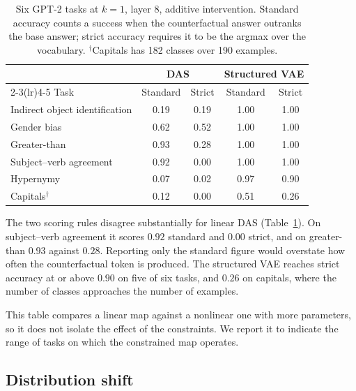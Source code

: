 \documentclass[11pt]{article}
\begin{document}
\begin{table}[t]
\centering
\small
\begin{tabular}{lcccc}
\toprule
& \multicolumn{2}{c}{DAS} & \multicolumn{2}{c}{Structured VAE} \\
\cmidrule(lr){2-3}\cmidrule(lr){4-5}
Task & Standard & Strict & Standard & Strict \\
\midrule
Indirect object identification & 0.19 & 0.19 & 1.00 & 1.00 \\
Gender bias                    & 0.62 & 0.52 & 1.00 & 1.00 \\
Greater-than                   & 0.93 & 0.28 & 1.00 & 1.00 \\
Subject--verb agreement        & 0.92 & 0.00 & 1.00 & 1.00 \\
Hypernymy                      & 0.07 & 0.02 & 0.97 & 0.90 \\
Capitals$^\dagger$             & 0.12 & 0.00 & 0.51 & 0.26 \\
\bottomrule
\end{tabular}
\caption{Six GPT-2 tasks at $k = 1$, layer 8, additive intervention. Standard
accuracy counts a success when the counterfactual answer outranks the base
answer; strict accuracy requires it to be the argmax over the vocabulary.
$^\dagger$Capitals has 182 classes over 190 examples.}
\label{tab:nlp}
\end{table}

The two scoring rules disagree substantially for linear DAS
(Table~\ref{tab:nlp}). On subject--verb agreement it scores $0.92$ standard and
$0.00$ strict, and on greater-than $0.93$ against $0.28$. Reporting only the
standard figure would overstate how often the counterfactual token is produced.
The structured VAE reaches strict accuracy at or above $0.90$ on five of six
tasks, and $0.26$ on capitals, where the number of classes approaches the number
of examples.

This table compares a linear map against a nonlinear one with more parameters, so
it does not isolate the effect of the constraints. We report it to indicate the
range of tasks on which the constrained map operates.

\subsection{Distribution shift}
\label{sec:shift}
\end{document}
